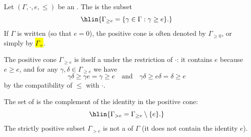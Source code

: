 \begin{definition} \label{definition:positive_cone_in_an_ordered_monoid}
    Let $(\Gamma,\cdot,e,\le)$ be an .
    The  is the subset
    $$\hlin{\Gamma_{\ge e} = \{\gamma \in \Gamma : \gamma \ge e\}.}$$
    If $\Gamma$ is written  (so that $e = 0$), the positive cone is often denoted by $\Gamma_{\ge 0}$, or simply by \hl{$\Gamma_+$}.

    The positive cone $\Gamma_{\ge e}$ is itself a  under the restriction of $\cdot$: it contains $e$ because $e \ge e$, and for any $\gamma,\delta \in \Gamma_{\ge e}$ we have
    $$\gamma\delta \ge \gamma e = \gamma \ge e \quad\text{and}\quad \gamma\delta \ge e\delta = \delta \ge e$$
    by the compatibility of $\le$ with $\cdot$.

    The set of  is the complement of the identity in the positive cone:
    $$\hlin{\Gamma_{> e} = \Gamma_{\ge e} \setminus \{e\}.}$$
    The strictly positive subset $\Gamma_{> e}$ is not a  of $\Gamma$ (it does not contain the identity $e$).
\end{definition}